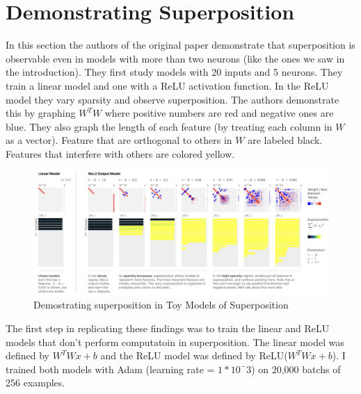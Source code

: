 \documentclass{article} %
\begin{document}
\section{Demonstrating Superposition}

In this section the authors of the original paper demonstrate that superposition
is observable even in models with more than two neurons (like the ones we saw in
the introduction). They first study models with 20 inputs and 5 neurons. They
train a linear model and one with a ReLU activation function. In the ReLU model
they vary sparsity and observe superposition.\newline\newline
The authors demonstrate this by graphing $W^TW$ where positive numbers are red
and negative ones are blue. They also graph the length of each feature (by treating
each column in $W$ as a vector). Feature that are orthogonal to others in $W$ are
labeled black. Features that interfere with others are colored yellow.\\

\begin{figure}[h]
    \centering
    \includegraphics[width=0.9\linewidth]{demonstrating_superposition/images/anthropic_section3.png}
    \captionsetup{font=footnotesize} %
    \caption{Demostrating superposition in Toy Models of Superposition \cite{elhage2022toy}}
    \label{fig:section3_anthropic}
\end{figure}

The first step in replicating these findings was to train the linear and ReLU
models that don't perform computatoin in superposition. The linear model was
defined by $W^TWx + b$ and the ReLU model was defined by ReLU($W^TWx + b$). I trained both models
with Adam (learning rate = $1*10^-3$) on 20,000 batchs of 256 examples.
\end{document}
